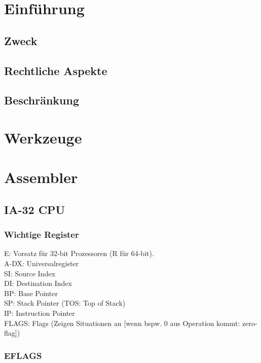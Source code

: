 \section{Einführung}
\subsection{Zweck}
\subsection{Rechtliche Aspekte}
\subsection{Beschränkung}
\section{Werkzeuge}
\section{Assembler}
\subsection{IA-32 CPU}
\subsubsection{Wichtige Register}
E: Vorsatz für 32-bit Prozessoren (R für 64-bit).\\
A-DX: Universalregister\\
SI: Source Index\\
DI: Destination Index\\
BP: Base Pointer\\
SP: Stack Pointer (TOS: Top of Stack)\\
IP: Instruction Pointer\\
FLAGS: Flags (Zeigen Situationen an [wenn bspw. 0 aus Operation kommt: zero-flag])
\subsubsection{EFLAGS}

